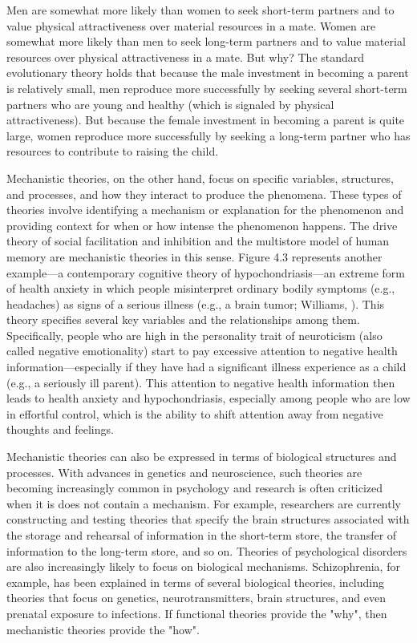 Men are somewhat more likely than women to seek short-term partners and to value physical attractiveness over material resources in a mate. Women are somewhat more likely than men to seek long-term partners and to value material resources over physical attractiveness in a mate. But why? The standard evolutionary theory holds that because the male investment in becoming a parent is relatively small, men reproduce more successfully by seeking several short-term partners who are young and healthy (which is signaled by physical attractiveness). But because the female investment in becoming a parent is quite large, women reproduce more successfully by seeking a long-term partner who has resources to contribute to raising the child.

Mechanistic theories, on the other hand, focus on specific variables, structures, and processes, and how they interact to produce the phenomena. These types of theories involve identifying a mechanism or explanation for the phenomenon and providing context for when or how intense the phenomenon happens. The drive theory of social facilitation and inhibition and the multistore model of human memory are mechanistic theories in this sense. Figure 4.3 represents another example---a contemporary cognitive theory of hypochondriasis---an extreme form of health anxiety in which people misinterpret ordinary bodily symptoms (e.g., headaches) as signs of a serious illness (e.g., a brain tumor; Williams, \citeyear{williams_psychopathology_2004}). This theory specifies several key variables and the relationships among them. Specifically, people who are high in the personality trait of neuroticism (also called negative emotionality) start to pay excessive attention to negative health information---especially if they have had a significant illness experience as a child (e.g., a seriously ill parent). This attention to negative health information then leads to health anxiety and hypochondriasis, especially among people who are low in effortful control, which is the ability to shift attention away from negative thoughts and feelings.

Mechanistic theories can also be expressed in terms of biological structures and processes. With advances in genetics and neuroscience, such theories are becoming increasingly common in psychology and research is often criticized when it is does not contain a mechanism. For example, researchers are currently constructing and testing theories that specify the brain structures associated with the storage and rehearsal of information in the short-term store, the transfer of information to the long-term store, and so on. Theories of psychological disorders are also increasingly likely to focus on biological mechanisms. Schizophrenia, for example, has been explained in terms of several biological theories, including theories that focus on genetics, neurotransmitters, brain structures, and even prenatal exposure to infections. If functional theories provide the "why", then mechanistic theories provide the "how".

